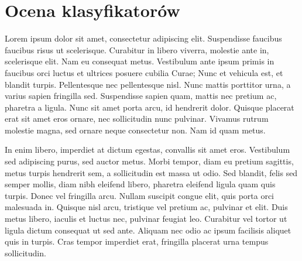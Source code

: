 \section{Ocena klasyfikatorów}
Lorem ipsum dolor sit amet, consectetur adipiscing elit. Suspendisse faucibus faucibus risus ut scelerisque. Curabitur in libero viverra, molestie ante in, scelerisque elit. Nam eu consequat metus. Vestibulum ante ipsum primis in faucibus orci luctus et ultrices posuere cubilia Curae; Nunc et vehicula est, et blandit turpis. Pellentesque nec pellentesque nisl. Nunc mattis porttitor urna, a varius sapien fringilla sed. Suspendisse sapien quam, mattis nec pretium ac, pharetra a ligula. Nunc sit amet porta arcu, id hendrerit dolor. Quisque placerat erat sit amet eros ornare, nec sollicitudin nunc pulvinar. Vivamus rutrum molestie magna, sed ornare neque consectetur non. Nam id quam metus.

In enim libero, imperdiet at dictum egestas, convallis sit amet eros. Vestibulum sed adipiscing purus, sed auctor metus. Morbi tempor, diam eu pretium sagittis, metus turpis hendrerit sem, a sollicitudin est massa ut odio. Sed blandit, felis sed semper mollis, diam nibh eleifend libero, pharetra eleifend ligula quam quis turpis. Donec vel fringilla arcu. Nullam suscipit congue elit, quis porta orci malesuada in. Quisque nisl arcu, tristique vel pretium ac, pulvinar et elit. Duis metus libero, iaculis et luctus nec, pulvinar feugiat leo. Curabitur vel tortor ut ligula dictum consequat ut sed ante. Aliquam nec odio ac ipsum facilisis aliquet quis in turpis. Cras tempor imperdiet erat, fringilla placerat urna tempus sollicitudin.

